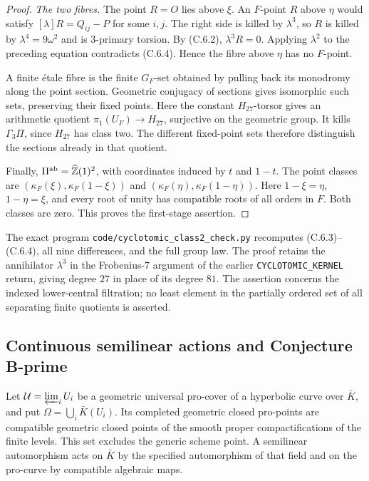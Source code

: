 \begin{proof}
\emph{The two fibres.}
The point $R=O$ lies above $\xi$. An $F$-point $R$ above $\eta$
would satisfy $[\lambda]R=Q_{ij}-P$ for some $i,j$.
The right side is killed by $\lambda^3$, so $R$ is killed by
$\lambda^4=9\omega^2$ and is $3$-primary torsion. By (C.6.2),
$\lambda^3R=0$. Applying $\lambda^2$ to the preceding equation
contradicts (C.6.4). Hence the fibre above $\eta$ has no $F$-point.

A finite \'etale fibre is the finite $G_F$-set obtained by pulling
back its monodromy along the point section. Geometric conjugacy
of sections gives isomorphic such sets, preserving their fixed
points. Here the constant $H_{27}$-torsor gives an arithmetic
quotient $\pi_1(U_F)\to H_{27}$, surjective on the geometric
group. It kills $\Gamma_3\Pi$, since $H_{27}$ has class two.
The different fixed-point sets therefore distinguish the sections
already in that quotient.

Finally, $\Pi^{\mathrm{ab}}=\widehat{\mathbb Z}(1)^2$, with coordinates
induced by $t$ and $1-t$. The point classes are
$(\kappa_F(\xi),\kappa_F(1-\xi))$ and
$(\kappa_F(\eta),\kappa_F(1-\eta))$.
Here $1-\xi=\eta$, $1-\eta=\xi$, and every root of unity has
compatible roots of all orders in $F$. Both classes are zero.
This proves the first-stage assertion.
\end{proof}

The exact program \texttt{code/cyclotomic\_class2\_check.py}
recomputes (C.6.3)--(C.6.4), all nine differences, and the full group
law. The proof retains the annihilator $\lambda^3$ in the
Frobenius-$7$ argument of the earlier \texttt{CYCLOTOMIC\_KERNEL}
return, giving degree $27$ in place of its degree $81$.
The assertion concerns the indexed lower-central filtration; no least
element in the partially ordered set of all separating finite
quotients is asserted.

\subsection{Continuous semilinear actions and Conjecture B-prime}

Let $\mathcal U=\varprojlim_i U_i$ be a geometric universal
pro-cover of a hyperbolic curve over $\bar K$, and put
$\Omega=\bigcup_i\bar K(U_i)$. Its completed geometric closed
pro-points are compatible geometric closed points of the smooth
proper compactifications of the finite levels. This set excludes
the generic scheme point. A semilinear automorphism acts on
$\bar K$ by the specified automorphism of that field and on the
pro-curve by compatible algebraic maps.

